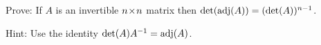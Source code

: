 
\begin{Exercise}[
name={},
title={}, 
difficulty=0,
origin={\cite{YL}}]
Prove: If $A$ is an invertible $n \! \times \! n$ matrix then 
$\det(\operatorname{adj}(A))=(\det(A))^{n-1}$.
\end{Exercise}
\begin{Answer}
Hint: Use the identity $\det(A)A^{-1}=\operatorname{adj}(A)$.
\end{Answer}
